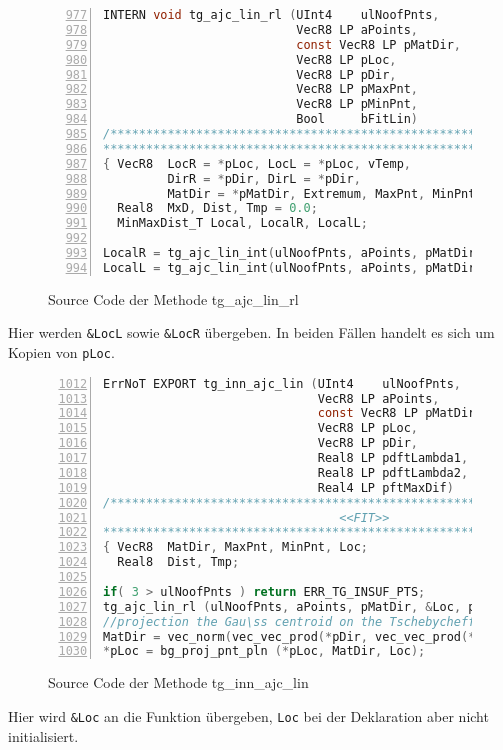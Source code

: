 \begin{figure}[H]
\begin{lstlisting}[language=C, numbers=left, firstnumber=977]
INTERN void tg_ajc_lin_rl (UInt4    ulNoofPnts,
                           VecR8 LP aPoints,
                           const VecR8 LP pMatDir,
                           VecR8 LP pLoc,
                           VecR8 LP pDir,
                           VecR8 LP pMaxPnt,
                           VecR8 LP pMinPnt, 
                           Bool     bFitLin)
/*************************************************************************
*************************************************************************/
{ VecR8  LocR = *pLoc, LocL = *pLoc, vTemp,
         DirR = *pDir, DirL = *pDir, 
         MatDir = *pMatDir, Extremum, MaxPnt, MinPnt, Loc;
  Real8  MxD, Dist, Tmp = 0.0;
  MinMaxDist_T Local, LocalR, LocalL;

LocalR = tg_ajc_lin_int(ulNoofPnts, aPoints, pMatDir, &LocR, &DirR, True,  bFitLin);
LocalL = tg_ajc_lin_int(ulNoofPnts, aPoints, pMatDir, &LocL, &DirL, False, bFitLin);
\end{lstlisting}
\caption{Source Code der Methode  tg\_ajc\_lin\_rl}
\end{figure}

Hier werden \verb|&LocL| sowie \verb|&LocR| übergeben. In beiden Fällen handelt es sich um Kopien von \verb|pLoc|.

\begin{figure}[H]
\begin{lstlisting}[language=C, numbers=left, firstnumber=1012]
ErrNoT EXPORT tg_inn_ajc_lin (UInt4    ulNoofPnts,
                              VecR8 LP aPoints,
                              const VecR8 LP pMatDir,
                              VecR8 LP pLoc,
                              VecR8 LP pDir,
                              Real8 LP pdftLambda1,
                              Real8 LP pdftLambda2,
                              Real4 LP pftMaxDif)
/*************************************************************************
                                 <<FIT>>
*************************************************************************/
{ VecR8  MatDir, MaxPnt, MinPnt, Loc;
  Real8  Dist, Tmp;

if( 3 > ulNoofPnts ) return ERR_TG_INSUF_PTS;
tg_ajc_lin_rl (ulNoofPnts, aPoints, pMatDir, &Loc, pDir, &MaxPnt, &MinPnt, True);
//projection the Gau\ss centroid on the Tschebycheff line
MatDir = vec_norm(vec_vec_prod(*pDir, vec_vec_prod(*pMatDir, *pDir)), &Tmp);
*pLoc = bg_proj_pnt_pln (*pLoc, MatDir, Loc);
\end{lstlisting}
\caption{Source Code der Methode  tg\_inn\_ajc\_lin}
\end{figure}

Hier wird \verb|&Loc| an die Funktion übergeben, \verb|Loc| bei der Deklaration aber nicht initialisiert.